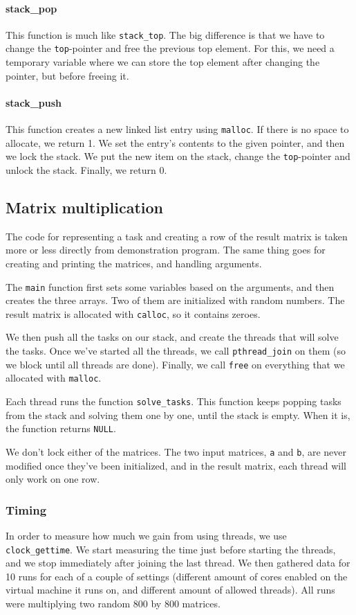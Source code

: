 \documentclass{article}
\begin{document}
\paragraph{stack\_pop}
This function is much like \texttt{stack\_top}. The big difference is that we have to change the \texttt{top}-pointer and free the previous top element. For this, we need a temporary variable where we can store the top element after changing the pointer, but before freeing it.

\paragraph{stack\_push}
This function creates a new linked list entry using \texttt{malloc}. If there is no space to allocate, we return 1. We set the entry's contents to the given pointer, and then we lock the stack. We put the new item on the stack, change the \texttt{top}-pointer and unlock the stack. Finally, we return 0.

\subsection{Matrix multiplication}
The code for representing a task and creating a row of the result matrix is taken more or less directly from demonstration program. The same thing goes for creating and printing the matrices, and handling arguments.

The \texttt{main} function first sets some variables based on the arguments, and then creates the three arrays. Two of them are initialized with random numbers. The result matrix is allocated with \texttt{calloc}, so it contains zeroes.

We then push all the tasks on our stack, and create the threads that will solve the tasks. Once we've started all the threads, we call \texttt{pthread\_join} on them (so we block until all threads are done). Finally, we call \texttt{free} on everything that we allocated with \texttt{malloc}.

Each thread runs the function \texttt{solve\_tasks}. This function keeps popping tasks from the stack and solving them one by one, until the stack is empty. When it is, the function returns \texttt{NULL}.

We don't lock either of the matrices. The two input matrices, \texttt{a} and \texttt{b}, are never modified once they've been initialized, and in the result matrix, each thread will only work on one row.

\subsubsection{Timing}
In order to measure how much we gain from using threads, we use \texttt{clock\_gettime}. We start measuring the time just before starting the threads, and we stop immediately after joining the last thread. We then gathered data for 10 runs for each of a couple of settings (different amount of cores enabled on the virtual machine it runs on, and different amount of allowed threads). All runs were multiplying two random 800 by 800 matrices.
\end{document}
